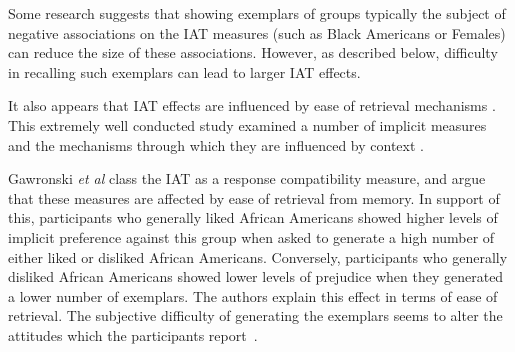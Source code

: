 
Some research \cite{Dasgupta2001} suggests that showing exemplars of groups typically the subject of negative associations on the IAT measures (such as Black Americans or Females) can reduce the size of these associations. However, as described below, difficulty in recalling such exemplars can lead to larger IAT effects. 

It also appears that IAT effects are influenced by ease of retrieval mechanisms \cite{Kahneman2002} . This extremely well conducted study examined a number of implicit measures and the mechanisms through which they are influenced by context \cite{Gawronski2005}. 

Gawronski \textit{et al} class the IAT as a response compatibility measure, and argue that these measures are affected by ease of retrieval from memory. In support of this, participants who generally liked African Americans showed higher levels of implicit preference against this group when asked to generate a high number of either liked or disliked African Americans. Conversely, participants who generally disliked African Americans showed lower levels of prejudice when they generated a lower number of exemplars. The authors explain this effect in terms of ease of retrieval. The subjective difficulty of generating the exemplars seems to alter the attitudes which the participants report~\cite{Kahneman2002}.




